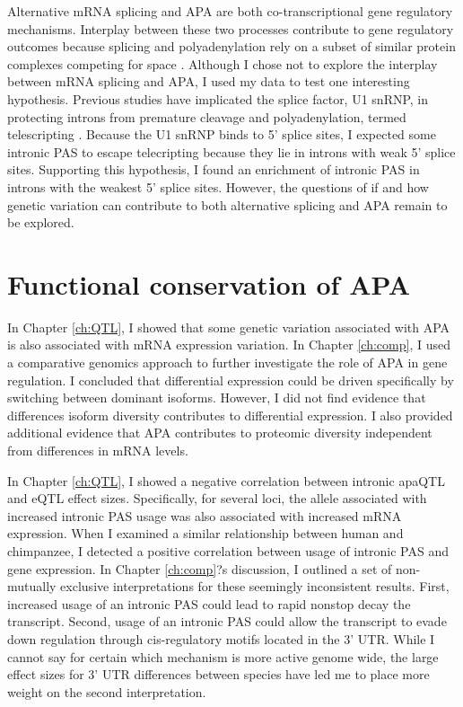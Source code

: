 Alternative mRNA splicing and APA are both co-transcriptional gene regulatory mechanisms. Interplay between these two processes contribute to gene regulatory outcomes because splicing and polyadenylation rely on a subset of similar protein complexes competing for space \citep{proudfoot_integrating_2002}. Although I chose not to explore the interplay between mRNA splicing and APA, I used my data to test one interesting hypothesis. Previous studies have implicated the splice factor, U1 snRNP, in protecting introns from premature cleavage and polyadenylation, termed telescripting \citep{kaida_u1_2010, berg_u1_2012, oh_u1_2017}.  Because the U1 snRNP binds to 5' splice sites, I expected some intronic PAS to escape telecripting because they lie in introns with weak 5' splice sites. Supporting this hypothesis, I found an enrichment of intronic PAS in introns with the weakest 5' splice sites. However, the questions of if and how genetic variation can contribute to both alternative splicing and APA remain to be explored.



\section{Functional conservation of APA }

In Chapter \ref{ch:QTL}, I showed that some genetic variation associated with APA is also associated with mRNA expression variation. In Chapter \ref{ch:comp}, I used a comparative genomics approach to further investigate the role of APA in gene regulation.  I concluded that differential expression could be driven specifically by switching between dominant isoforms. However, I did not find evidence that differences isoform diversity contributes to differential expression. I also provided additional evidence that APA contributes to proteomic diversity independent from differences in mRNA levels. 

In Chapter \ref{ch:QTL}, I showed a negative correlation between intronic apaQTL and eQTL effect sizes. Specifically, for several loci, the allele associated with increased intronic PAS usage was also associated with increased mRNA expression. When I examined a similar relationship between human and chimpanzee, I detected a positive correlation between usage of intronic PAS and gene expression. In Chapter \ref{ch:comp}?s discussion, I outlined a set of non-mutually exclusive interpretations for these seemingly inconsistent results. First, increased usage of an intronic PAS could lead to rapid nonstop decay the transcript. Second, usage of an intronic PAS could allow the transcript to evade down regulation through cis-regulatory motifs located in the 3' UTR. While I cannot say for certain which mechanism is more active genome wide, the large effect sizes for 3' UTR differences between species have led me to place more weight on the second interpretation.  


